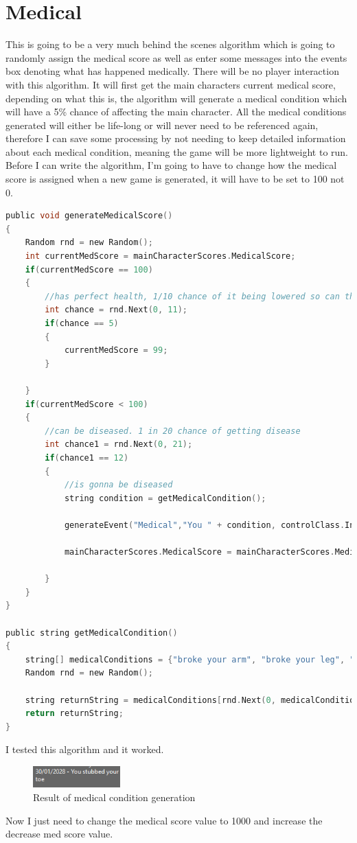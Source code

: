 \section{Medical}
This is going to be a very much behind the scenes algorithm which is going to randomly assign the medical score as well as enter some messages into the events box denoting what has happened medically. There will be no player interaction with this algorithm.
It will first get the main character\textquotesingle s current medical score, depending on what this is, the algorithm will generate a medical condition which will have a 5\% chance of affecting the main character. All the medical conditions generated will either be life-long or will never need to be referenced again, therefore I can save some processing by not needing to keep detailed information about each medical condition, meaning the game will be more lightweight to run.
Before I can write the algorithm, I'm going to have to change how the medical score is assigned when a new game is generated, it will have to be set to 100 not 0.
\begin{lstlisting}[language=c, style=csharp, caption=Medical score algorithms]
public void generateMedicalScore()
{
    Random rnd = new Random();
    int currentMedScore = mainCharacterScores.MedicalScore;
    if(currentMedScore == 100)
    {
        //has perfect health, 1/10 chance of it being lowered so can then be diseased.
        int chance = rnd.Next(0, 11);
        if(chance == 5)
        {
            currentMedScore = 99;
        }

    }
    if(currentMedScore < 100)
    {
        //can be diseased. 1 in 20 chance of getting disease
        int chance1 = rnd.Next(0, 21);
        if(chance1 == 12)
        {
            //is gonna be diseased
            string condition = getMedicalCondition();

            generateEvent("Medical","You " + condition, controlClass.InGameDate);

            mainCharacterScores.MedicalScore = mainCharacterScores.MedicalScore - rnd.Next(0, 50);

        }
    }
}

public string getMedicalCondition()
{
    string[] medicalConditions = {"broke your arm", "broke your leg", "stubbed your toe" };
    Random rnd = new Random();

    string returnString = medicalConditions[rnd.Next(0, medicalConditions.Length)];
    return returnString;
}
\end{lstlisting}
I tested this algorithm and it worked.
\begin{figure}[H]
    \centering
    \includegraphics[width=0.3\textwidth]{images/implementation/medical1.png}
    \caption{Result of medical condition generation}
    \label{fig:implementation-medical1}
\end{figure}
\noindent Now I just need to change the medical score value to 1000 and increase the decrease med score value.


